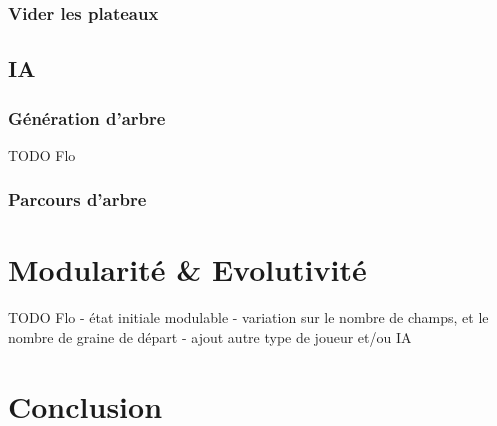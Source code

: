 \documentclass[]{article}
\begin{document}
\subsubsection{Vider les plateaux}



\subsection{IA}

\subsubsection{Génération d'arbre}

TODO Flo

\subsubsection{Parcours d'arbre}

\section{Modularité \& Evolutivité}

TODO Flo
	- état initiale modulable
	- variation sur le nombre de champs, et le nombre de graine de départ
	- ajout autre type de joueur et/ou IA

\section{Conclusion}
\end{document}
